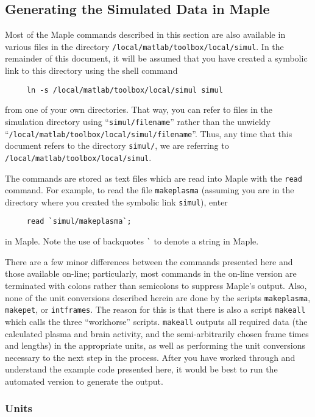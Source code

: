 \documentclass[11pt]{article}
\begin{document}
\subsection{Generating the Simulated Data in Maple}

Most of the Maple commands described in this section are also
available in various files in the directory
\verb|/local/matlab/toolbox/local/simul|.  In the remainder of this
document, it will be assumed that you have created a symbolic link to
this directory using the shell command
\begin{verbatim}
     ln -s /local/matlab/toolbox/local/simul simul
\end{verbatim}
from one of your own directories.  That way, you can refer to files in
the simulation directory using ``\verb|simul/filename|'' rather than
the unwieldy ``\verb|/local/matlab/toolbox/local/simul/filename|''.
Thus, any time that this document refers to the directory
\verb|simul/|, we are referring to \\
\verb|/local/matlab/toolbox/local/simul|.

The commands are stored as text files which are read into Maple with
the \verb|read| command.  For example, to read the file
\verb|makeplasma| (assuming you are in the directory where you created
the symbolic link \verb|simul|), enter 
\begin{verbatim}
     read `simul/makeplasma`;
\end{verbatim}
in Maple.  Note the use of backquotes \verb|`| to denote a string in Maple.

There are a few minor differences between the commands presented here
and those available on-line; particularly, most commands in the
on-line version are terminated with colons rather than semicolons to
suppress Maple's output.  Also, none of the unit conversions described
herein are done by the scripts \verb|makeplasma|, \verb|makepet|, or
\verb|intframes|.  The reason for this is that there is also a script 
\verb|makeall| which calls the three ``workhorse'' scripts.  
\verb|makeall| outputs all required data (the calculated plasma 
and brain activity, and the semi-arbitrarily chosen frame times and
lengths) in the appropriate units, as well as performing the unit
conversions necessary to the next step in the process.  After you have
worked through and understand the example code presented here, it
would be best to run the automated version to generate the output.

\subsubsection{Units}
\end{document}
